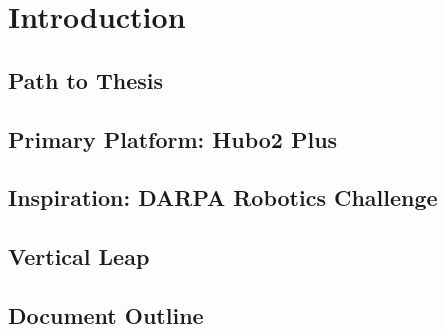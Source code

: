 \chapter{Introduction}
	


	\section{Path to Thesis}\label{sec:roadmap}	
		

	\section{Primary Platform: Hubo2 Plus}\label{sec:hubo}
			




	\section{Inspiration: DARPA Robotics Challenge}\label{sec:drc}
    		

    	\section{Vertical Leap}
		


	
	\section{Document Outline} 
	

